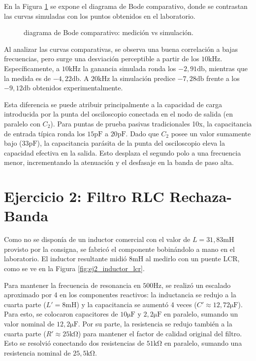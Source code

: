 En la Figura \ref{fig:ej1_bode_comparativa} se expone el diagrama de Bode comparativo, donde se 
contrastan las curvas simuladas con los puntos obtenidos en el laboratorio.

\begin{figure}[!ht]
    \centering
    
    \caption{diagrama de Bode comparativo: medición vs simulación.}
    \label{fig:ej1_bode_comparativa}
\end{figure}

Al analizar las curvas comparativas, se observa una buena correlación a bajas frecuencias, pero surge una
desviación perceptible a partir de los $10 \si{\kilo\hertz}$. Específicamente, a $10 \si{\kilo\hertz}$ la ganancia
simulada ronda los $-2,91 \si{\decibel}$, mientras que la medida es de $-4,22 \si{\decibel}$. A
$20 \si{\kilo\hertz}$ la simulación predice $-7,28 \si{\decibel}$ frente a los $-9,12 \si{\decibel}$ obtenidos
experimentalmente.

Esta diferencia se puede atribuir principalmente a la capacidad de carga introducida por la punta del osciloscopio
conectada en el nodo de salida (en paralelo con $C_2$). Para puntas de prueba pasivas tradicionales 10x, la capacitancia
de entrada típica ronda los $15 \si{\pico\farad}$ a $20 \si{\pico\farad}$. Dado que $C_2$ posee un valor sumamente bajo
($33\si{\pico\farad}$), la capacitancia parásita de la punta del osciloscopio eleva la capacidad efectiva en la salida.
Esto desplaza el segundo polo a una frecuencia menor, incrementando la atenuación y el desfasaje en la banda de paso
alta.

\section{Ejercicio 2: Filtro RLC Rechaza-Banda}

Como no se disponía de un inductor comercial con el valor de $L = 31,83 \si{\milli\henry}$ provisto por la
consigna, se fabricó el componente bobinándolo a mano en el laboratorio. El inductor resultante midió
$8 \si{\milli\henry}$ al medirlo con un puente LCR, como se ve en la Figura \ref{fig:ej2_inductor_lcr}.

Para mantener la frecuencia de resonancia en $500 \si{\hertz}$, se realizó un escalado aproximado por 4
en los componentes reactivos: la inductancia se redujo a la cuarta parte ($L' = 8 \si{\milli\henry}$) y la
capacitancia se aumentó 4 veces ($C' \approx 12,72 \si{\micro\farad}$). Para esto, se colocaron
capacitores de $10 \si{\micro\farad}$ y $2,2 \si{\micro\farad}$ en paralelo, sumando un valor nominal de
$12,2 \si{\micro\farad}$. Por su parte, la resistencia se redujo también a la cuarta parte
($R' \approx 25 \si{\kilo\ohm}$) para mantener el factor de calidad original del filtro. Esto se resolvió
conectando dos resistencias de $51 \si{\kilo\ohm}$ en paralelo, sumando una resistencia nominal de
$25,5 \si{\kilo\ohm}$.

